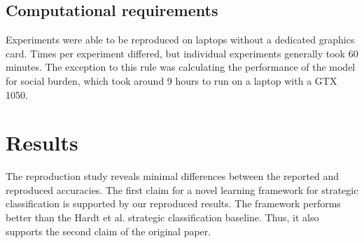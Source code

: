 \subsection{Computational requirements}
Experiments were able to be reproduced on laptops without a dedicated graphics card. Times per experiment differed, but individual experiments generally took 60 minutes. The exception to this rule was calculating the performance of the model for social burden, which took around 9 hours to run on a laptop with a GTX 1050.

\section{Results}
\label{sec:results}
The reproduction study reveals minimal differences between the reported and reproduced accuracies. The first claim for a novel learning framework for strategic classification is supported by our reproduced results. The framework performs better than the Hardt et al.\cite{hardt2016strategic} strategic classification baseline. Thus, it also supports the second claim of the original paper.

